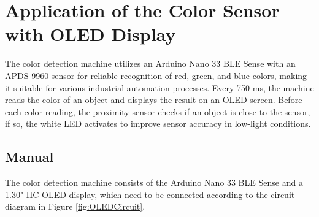 %
%
%



\chapter{Application of the Color Sensor with OLED Display}

The color detection machine utilizes an Arduino Nano 33 BLE Sense with an APDS-9960 sensor for reliable recognition of red, green, and blue colors, making it suitable for various industrial automation processes. Every 750 ms, the machine reads the color of an object and displays the result on an OLED screen. Before each color reading, the proximity sensor checks if an object is close to the sensor, if so, the white LED activates to improve sensor accuracy in low-light conditions.

\section{Manual}
The color detection machine consists of the Arduino Nano 33 BLE Sense and a 1.30" IIC OLED display, which need to be connected according to the circuit diagram in Figure \ref{fig:OLEDCircuit}.

